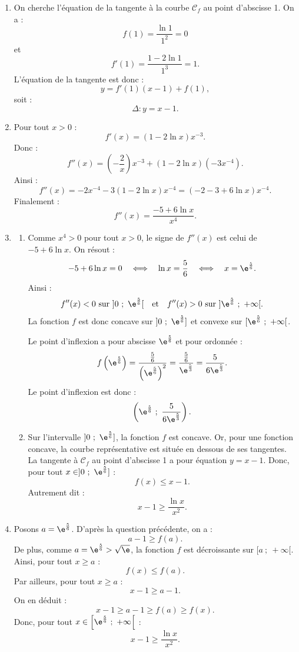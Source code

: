 \begin{enumerate}
	\item On cherche l'équation de la tangente à la courbe $\mathcal C_f$ au point d'abscisse 1.
	On a :
	\[
	f(1)=\dfrac{\ln 1}{1^2}=0
	\]
	et
	\[
	f'(1)=\dfrac{1-2\ln 1}{1^3}=1.
	\]
	L'équation de la tangente est donc :
	\[
	y=f'(1)(x-1)+f(1),
	\]
	soit :
	\[
	\Delta : y=x-1.
	\]

	\item Pour tout $x>0$ :
	\[
	f'(x)=(1-2\ln x)x^{-3}.
	\]
	Donc :
	\[
	f''(x)=\left(-\dfrac2x\right)x^{-3}+(1-2\ln x)(-3x^{-4}).
	\]
	Ainsi :
	\[
	f''(x)=-2x^{-4}-3(1-2\ln x)x^{-4}
	=\left(-2-3+6\ln x\right)x^{-4}.
	\]
	Finalement :
	\[
	f''(x)=\dfrac{-5+6\ln x}{x^4}.
	\]

	\item \begin{enumerate}
		\item Comme $x^4>0$ pour tout $x>0$, le signe de $f''(x)$ est celui de $-5+6\ln x$.
		On résout :
		\[
		-5+6\ln x=0
		\quad\Longleftrightarrow\quad
		\ln x=\dfrac56
		\quad\Longleftrightarrow\quad
		x=\e^{\frac56}.
		\]
		Ainsi :
		\[
		f''(x)<0 \text{ sur } ]0~;~\e^{\frac56}[
		\quad\text{et}\quad
		f''(x)>0 \text{ sur } ]\e^{\frac56}~;~+\infty[.
		\]
		La fonction $f$ est donc concave sur $]0~;~\e^{\frac56}]$ et convexe sur $[\e^{\frac56}~;~+\infty[$.

		Le point d'inflexion a pour abscisse $\e^{\frac56}$ et pour ordonnée :
		\[
		f\left(\e^{\frac56}\right)
		=\dfrac{\frac56}{\left(\e^{\frac56}\right)^2}
		=\dfrac{\frac56}{\e^{\frac53}}
		=\dfrac{5}{6\e^{\frac53}}.
		\]
		Le point d'inflexion est donc :
		\[
		\left(\e^{\frac56}~;~\dfrac{5}{6\e^{\frac53}}\right).
		\]

		\item Sur l'intervalle $]0~;~\e^{\frac56}]$, la fonction $f$ est concave.
		Or, pour une fonction concave, la courbe représentative est située en dessous de ses tangentes.
		La tangente à $\mathcal C_f$ au point d'abscisse 1 a pour équation $y=x-1$.
		Donc, pour tout $x\in ]0~;~\e^{\frac56}]$ :
		\[
		f(x)\leqslant x-1.
		\]
		Autrement dit :
		\[
		x-1\geqslant \dfrac{\ln x}{x^2}.
		\]
	\end{enumerate}

	\item Posons $a=\e^{\frac56}$.
	D'après la question précédente, on a :
	\[
	a-1\geqslant f(a).
	\]
	De plus, comme $a=\e^{\frac56}>\sqrt\e$, la fonction $f$ est décroissante sur $[a~;~+\infty[$.
	Ainsi, pour tout $x\geqslant a$ :
	\[
	f(x)\leqslant f(a).
	\]
	Par ailleurs, pour tout $x\geqslant a$ :
	\[
	x-1\geqslant a-1.
	\]
	On en déduit :
	\[
	x-1\geqslant a-1\geqslant f(a)\geqslant f(x).
	\]
	Donc, pour tout $x\in\left[\e^{\frac56}~;~+\infty\right[$ :
	\[
	x-1\geqslant \dfrac{\ln x}{x^2}.
	\]
\end{enumerate}

